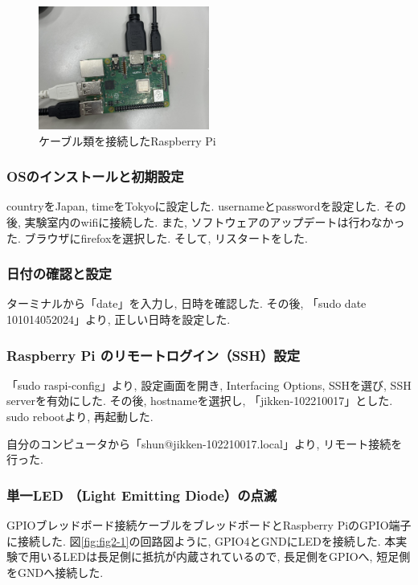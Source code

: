 \documentclass{ltjsarticle} %
\begin{document}
\begin{figure}[H] %
  \centering
  \includegraphics[width=0.5\textwidth]{raspi.JPEG} %
  \caption{ケーブル類を接続したRaspberry Pi} %
  \label{fig:raspi} %
\end{figure}

\subsubsection{OSのインストールと初期設定}
countryをJapan, timeをTokyoに設定した. usernameとpasswordを設定した. その後, 実験室内のwifiに接続した.
また, ソフトウェアのアップデートは行わなかった. ブラウザにfirefoxを選択した. そして, リスタートをした.

\subsubsection{⽇付の確認と設定}
ターミナルから「date」を入力し, 日時を確認した. 
その後,  「sudo date 101014052024」より, 正しい日時を設定した.

\subsubsection{Raspberry Pi のリモートログイン（SSH）設定}
「sudo raspi-config」より, 設定画面を開き, Interfacing Options, SSHを選び, 
SSH serverを有効にした. その後, hostnameを選択し, 「jikken-102210017」とした.
sudo rebootより, 再起動した.

自分のコンピュータから「shun@jikken-102210017.local」より, リモート接続を行った.


\subsubsection{ 単⼀LED （Light Emitting Diode）の点滅}
GPIOブレッドボード接続ケーブルをブレッドボードとRaspberry PiのGPIO端⼦に接続した. 
図\ref{fig:fig2-1}の回路図ように, GPIO4とGNDにLEDを接続した. 
本実験で⽤いるLEDは⻑⾜側に抵抗が内蔵されているので, ⻑⾜側をGPIOへ, 短⾜側をGNDへ接続した.
\end{document}
